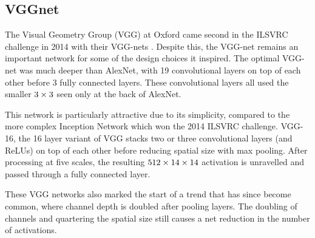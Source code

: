 
\subsection{VGGnet}
The Visual Geometry Group (VGG) at Oxford came second in the ILSVRC challenge in
2014 with their VGG-nets \cite{simonyan_very_2014}. Despite this, the VGG-net remains an important
network for some of the design choices it inspired. The optimal VGG-net was much deeper than
AlexNet, with 19 convolutional layers on top of each other before 3 fully connected layers.
These convolutional layers all used the smaller $3\times 3$ seen only at the back of AlexNet.

This network is particularly attractive due to its simplicity, compared to the
more complex Inception Network \cite{szegedy_going_2015} which won the 2014
ILSVRC challenge. VGG-16, the 16 layer variant of VGG stacks two or three
convolutional layers (and ReLUs) on top of each other before reducing spatial
size with max pooling. After processing at five scales, the resulting $512 \times 14
\times 14$ activation is unravelled and passed through a fully connected layer.

These VGG networks also marked the start of a trend that has since become
common, where channel depth is doubled after pooling layers. The doubling of
channels and quartering the spatial size still causes a net reduction in the
number of activations.

